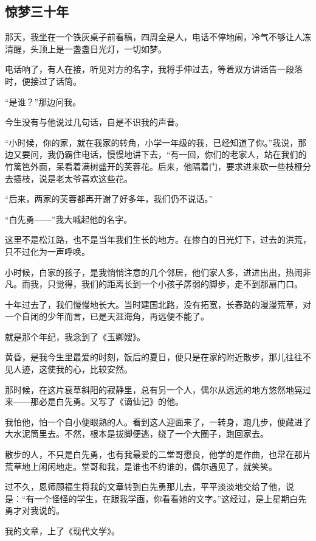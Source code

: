 \subsection{惊梦三十年}


\par 那天，我坐在一个铁灰桌子前看稿，四周全是人，电话不停地闹，冷气不够让人冻清醒，头顶上是一盏盏日光灯，一切如梦。
\par 电话响了，有人在接，听见对方的名字，我将手伸过去，等着双方讲话告一段落时，便接过了话筒。
\par “是谁？”那边问我。
\par 今生没有与他说过几句话，自是不识我的声音。
\par “小时候，你的家，就在我家的转角，小学一年级的我，已经知道了你。”我说，那边又要问，我仍霸住电话，慢慢地讲下去，“有一回，你们的老家人，站在我们的竹篱笆外面，呆看着满树盛开的芙蓉花。后来，他隔着门，要求进来砍一些枝桠分去插枝，说是老太爷喜欢这些花。
\par “后来，两家的芙蓉都再开谢了好多年，我们仍不说话。”
\par “白先勇——”我大喊起他的名字。
\par 这里不是松江路，也不是当年我们生长的地方。在惨白的日光灯下，过去的洪荒，只不过化为一声呼唤。
\par 小时候，白家的孩子，是我悄悄注意的几个邻居，他们家人多，进进出出，热闹非凡。而我，只觉得，我们的距离长到一个小孩子孱弱的脚步，走不到那扇门口。
\par 十年过去了，我们慢慢地长大。当时建国北路，没有拓宽，长春路的漫漫荒草，对一个自闭的少年而言，已是天涯海角，再远便不能了。
\par 就是那个年纪，我念到了《玉卿嫂》。
\par 黄昏，是我今生里最爱的时刻，饭后的夏日，便只是在家的附近散步，那儿往往不见人迹，这使我的心，比较安然。
\par 那时候，在这片衰草斜阳的寂静里，总有另一个人，偶尔从远远的地方悠然地晃过来——那必是白先勇。又写了《谪仙记》的他。
\par 我怕他，怕一个自小便眼熟的人。看到这人迎面来了，一转身，跑几步，便藏进了大水泥筒里去。不然，根本是拔脚便逃，绕了一个大圈子，跑回家去。
\par 散步的人，不只是白先勇，也有我最爱的二堂哥懋良，他学的是作曲，也常在那片荒草地上闲闲地走。堂哥和我，是谁也不约谁的，偶尔遇见了，就笑笑。
\par 过不久，恩师顾福生将我的文章转到白先勇那儿去，平平淡淡地交给了他，说是：“有一个怪怪的学生，在跟我学画，你看看她的文字。”这经过，是上星期白先勇才对我说的。
\par 我的文章，上了《现代文学》。
